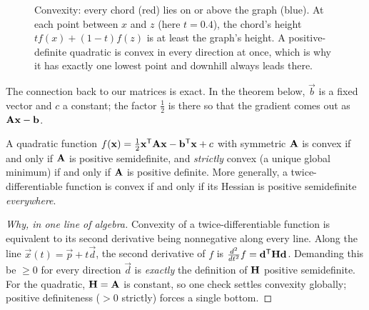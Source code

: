 \begin{figure}[H]
\centering
{}
\caption{Convexity: every chord (red) lies on or above the graph (blue). At each point
between $x$ and $z$ (here $t=0.4$), the chord's height $t f(x)+(1-t)f(z)$ is at least
the graph's height. A positive-definite quadratic is convex in every direction at once,
which is why it has exactly one lowest point and downhill always leads there.}
\label{ch36:fig-convex}
\end{figure}

The connection back to our matrices is exact. In the theorem below, $\vec{b}$ is a
fixed vector and $c$ a constant; the factor $\tfrac12$ is there so that the gradient
comes out as $\mathbf{A}\mathbf{x}-\mathbf{b}$.

\begin{theorem}
\label{ch36:thm-convex}
A quadratic function $f(\mathbf{x})=\tfrac12\mathbf{x}^{\mathsf{T}}\mathbf{A}\mathbf{x} - \mathbf{b}^{\mathsf{T}}\mathbf{x}+c$
with symmetric $\mathbf{A}$ is convex if and only if $\mathbf{A}$ is positive
semidefinite, and \emph{strictly} convex (a unique global minimum) if and only if
$\mathbf{A}$ is positive definite. More generally, a twice-differentiable function is
convex if and only if its Hessian is positive semidefinite \emph{everywhere}.
\end{theorem}

\begin{proof}[Why, in one line of algebra]
Convexity of a twice-differentiable function is equivalent to its second derivative
being nonnegative along every line. Along the line $\vec{x}(t)=\vec{p}+t\vec{d}$, the
second derivative of $f$ is $\frac{d^2}{dt^2}f = \mathbf{d}^{\mathsf{T}}\mathbf{H}\mathbf{d}$. Demanding
this be $\ge 0$ for every direction $\vec{d}$ is \emph{exactly} the definition of
$\mathbf{H}$ positive semidefinite. For the quadratic, $\mathbf{H}=\mathbf{A}$ is constant, so
one check settles convexity globally; positive definiteness ($>0$ strictly) forces a
single bottom.
\end{proof}

